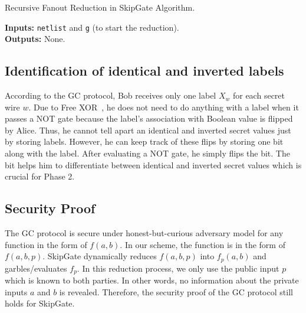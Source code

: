 \begin{algorithm}[t!]
\caption{Recursive Fanout Reduction in SkipGate Algorithm.}
\textbf{Inputs:} \texttt{netlist} and \texttt{g} (to start the reduction).\\
\textbf{Outputs:} None.\\
\label{skipgate_reduction}
\begin{algorithmic}[1]

\ENDIF
{}
	\ENDIF
	\ENDIF
\ENDIF
\end{algorithmic}
\end{algorithm}

\subsection{Identification of identical and inverted labels} According to the GC protocol, Bob receives only one label $X_w$ for each secret wire $w$.
Due to Free XOR~\cite{kolesnikov2008improved}, he does not need to do anything with a label when it passes a NOT gate because the label's association with Boolean value is flipped by Alice.
Thus, he cannot tell apart an identical and inverted secret values just by storing labels.
However, he can keep track of these flips by storing one bit along with the label.
After evaluating a NOT gate, he simply flips the bit.
The bit helps him to differentiate between identical and inverted secret values which is crucial for Phase 2.

\subsection{Security Proof} The GC protocol is secure under honest-but-curious adversary model for any function in the form of $f(a,b)$.
In our scheme, the function is in the form of $f(a,b,p)$.
SkipGate dynamically reduces $f(a,b,p)$ into $f_p(a,b)$ and garbles/evaluates $f_p$.
In this reduction process, we only use the public input $p$ which is known to both parties.
In other words, no information about the private inputs $a$ and $b$ is revealed.
Therefore, the security proof of the GC protocol still holds for SkipGate.
